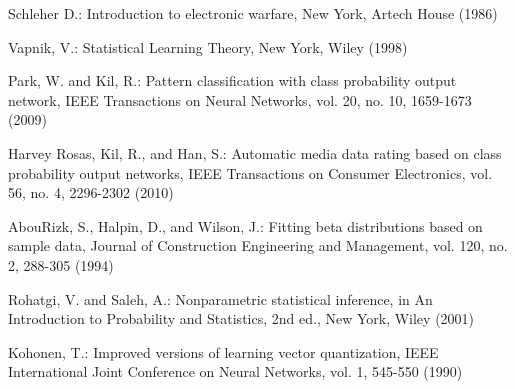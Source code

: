 \documentclass[runningheads,a4paper]{llncs}
\begin{document}
\begin{thebibliography}{4}

 Schleher D.: Introduction to electronic warfare, New York, Artech House (1986)

 Vapnik, V.: Statistical Learning Theory, New York, Wiley (1998)

 Park, W. and Kil, R.: Pattern classification with class probability output network,
        IEEE Transactions on Neural Networks, vol. 20, no. 10, 1659-1673 (2009)

 Harvey Rosas, Kil, R., and Han, S.: Automatic media data rating based on class probability output networks,
        IEEE Transactions on Consumer Electronics, vol. 56, no. 4, 2296-2302 (2010)

 AbouRizk, S., Halpin, D., and Wilson, J.: Fitting beta distributions based on sample data, Journal of Construction Engineering and Management,
        vol. 120, no. 2, 288-305 (1994)

 Rohatgi, V. and Saleh, A.: Nonparametric statistical inference, in An Introduction to Probability and Statistics, 2nd ed., New York, Wiley (2001)

 Kohonen, T.: Improved versions of learning vector quantization, IEEE International Joint Conference on Neural Networks, vol. 1, 545-550 (1990)

\end{thebibliography}
\end{document}
